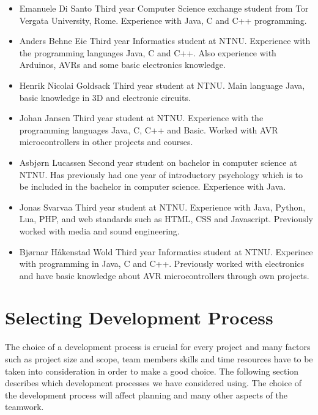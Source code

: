 \begin{itemize}
\item{Emanuele Di Santo}\newline
Third year Computer Science exchange student from Tor Vergata University, Rome.
Experience with Java, C and C++ programming.

\item{Anders Behne Eie}\newline
Third year Informatics student at NTNU. Experience with the programming languages Java, C and C++. Also experience with Arduinos, AVRs and some basic electronics knowledge.

\item{Henrik Nicolai Goldsack}\newline
Third year student at NTNU. Main language Java, basic knowledge in 3D and electronic circuits.

\item{Johan Jansen}\newline
Third year student at NTNU. Experience with the programming languages Java, C, C++  and 
Basic. Worked with AVR microcontrollers in other projects and courses.

\item{Asbjørn Lucassen}\newline
Second year student on bachelor in computer science at NTNU. Has previously had one year of introductory psychology which is to be included in the bachelor in computer science.
Experience with Java.

\item{Jonas Svarvaa}\newline
Third year student at NTNU. Experience with Java, Python, Lua, PHP, and web standards such as HTML, CSS and Javascript. Previously worked with media and sound engineering.

\item{Bjørnar Håkenstad Wold}\newline
Third year Informatics student at NTNU. Experince with programming in Java, C and C++. Previously worked with electronics and have basic knowledge about AVR microcontrollers through own projects.
\end{itemize}

\newpage
\section{Selecting Development Process}
The choice of a development process is crucial for every project and many factors
such as project size and scope, team members skills and time resources have to be taken into
consideration in order to make a good choice. The following section describes
which development processes we have considered using. The choice of the development process
will affect planning and many other aspects of the teamwork.

